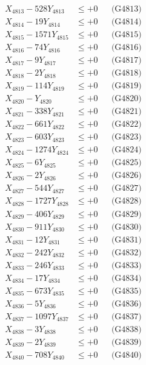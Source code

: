 \documentclass[a4paper,10pt]{article}
\begin{document}
{\begin{align}
X_{4813} - 528Y_{4813} &\leq +0 && \text{(G4813)} \\
X_{4814} - 19Y_{4814} &\leq +0 && \text{(G4814)} \\
X_{4815} - 1571Y_{4815} &\leq +0 && \text{(G4815)} \\
X_{4816} - 74Y_{4816} &\leq +0 && \text{(G4816)} \\
X_{4817} - 9Y_{4817} &\leq +0 && \text{(G4817)} \\
X_{4818} - 2Y_{4818} &\leq +0 && \text{(G4818)} \\
X_{4819} - 114Y_{4819} &\leq +0 && \text{(G4819)} \\
X_{4820} - Y_{4820} &\leq +0 && \text{(G4820)} \\
\allowbreak
X_{4821} - 338Y_{4821} &\leq +0 && \text{(G4821)} \\
X_{4822} - 661Y_{4822} &\leq +0 && \text{(G4822)} \\
X_{4823} - 603Y_{4823} &\leq +0 && \text{(G4823)} \\
X_{4824} - 1274Y_{4824} &\leq +0 && \text{(G4824)} \\
X_{4825} - 6Y_{4825} &\leq +0 && \text{(G4825)} \\
X_{4826} - 2Y_{4826} &\leq +0 && \text{(G4826)} \\
X_{4827} - 544Y_{4827} &\leq +0 && \text{(G4827)} \\
X_{4828} - 1727Y_{4828} &\leq +0 && \text{(G4828)} \\
X_{4829} - 406Y_{4829} &\leq +0 && \text{(G4829)} \\
X_{4830} - 911Y_{4830} &\leq +0 && \text{(G4830)} \\
\allowbreak
X_{4831} - 12Y_{4831} &\leq +0 && \text{(G4831)} \\
X_{4832} - 242Y_{4832} &\leq +0 && \text{(G4832)} \\
X_{4833} - 246Y_{4833} &\leq +0 && \text{(G4833)} \\
X_{4834} - 17Y_{4834} &\leq +0 && \text{(G4834)} \\
X_{4835} - 673Y_{4835} &\leq +0 && \text{(G4835)} \\
X_{4836} - 5Y_{4836} &\leq +0 && \text{(G4836)} \\
X_{4837} - 1097Y_{4837} &\leq +0 && \text{(G4837)} \\
X_{4838} - 3Y_{4838} &\leq +0 && \text{(G4838)} \\
X_{4839} - 2Y_{4839} &\leq +0 && \text{(G4839)} \\
X_{4840} - 708Y_{4840} &\leq +0 && \text{(G4840)} \\

\end{align}}
\end{document}
